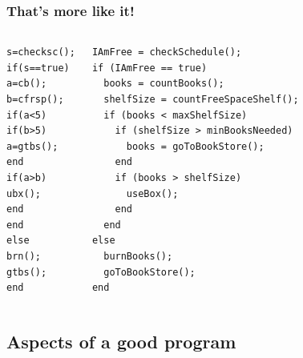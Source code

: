 \begin{frame}[fragile]
 \frametitle{That's more like it!}
 \begin{columns}[T]
     \begin{lstlisting}
s=checksc();
if(s==true)
a=cb();
b=cfrsp();
if(a<5)
if(b>5)
a=gtbs();
end
if(a>b)
ubx();
end
end
else
brn();
gtbs();
end
 \end{lstlisting}
     \begin{lstlisting}
IAmFree = checkSchedule();
if (IAmFree == true)
  books = countBooks();
  shelfSize = countFreeSpaceShelf();
  if (books < maxShelfSize)
    if (shelfSize > minBooksNeeded)
      books = goToBookStore();
    end
    if (books > shelfSize)
      useBox();
    end
  end
else
  burnBooks();
  goToBookStore();
end
 \end{lstlisting}
 \end{columns}
\end{frame}

\subsection*{Aspects of a good program}

